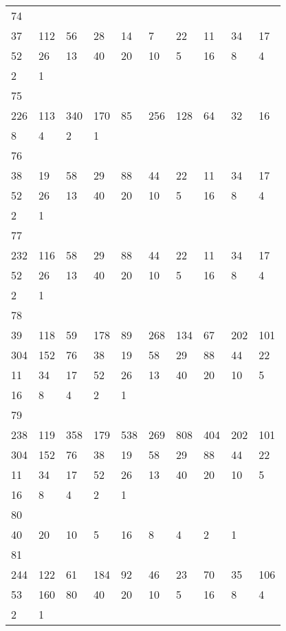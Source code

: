 \begin{longtable}{*{10}{l}}
74&&&&&&&&&\\
37& 112& 56& 28& 14& 7& 22& 11& 34& 17\\
52& 26& 13& 40& 20& 10& 5& 16& 8& 4\\
2& 1& \\

75&&&&&&&&&\\
226& 113& 340& 170& 85& 256& 128& 64& 32& 16\\
8& 4& 2& 1& \\

76&&&&&&&&&\\
38& 19& 58& 29& 88& 44& 22& 11& 34& 17\\
52& 26& 13& 40& 20& 10& 5& 16& 8& 4\\
2& 1& \\

77&&&&&&&&&\\
232& 116& 58& 29& 88& 44& 22& 11& 34& 17\\
52& 26& 13& 40& 20& 10& 5& 16& 8& 4\\
2& 1& \\

78&&&&&&&&&\\
39& 118& 59& 178& 89& 268& 134& 67& 202& 101\\
304& 152& 76& 38& 19& 58& 29& 88& 44& 22\\
11& 34& 17& 52& 26& 13& 40& 20& 10& 5\\
16& 8& 4& 2& 1& \\

79&&&&&&&&&\\
238& 119& 358& 179& 538& 269& 808& 404& 202& 101\\
304& 152& 76& 38& 19& 58& 29& 88& 44& 22\\
11& 34& 17& 52& 26& 13& 40& 20& 10& 5\\
16& 8& 4& 2& 1& \\

80&&&&&&&&&\\
40& 20& 10& 5& 16& 8& 4& 2& 1& \\

81&&&&&&&&&\\
244& 122& 61& 184& 92& 46& 23& 70& 35& 106\\
53& 160& 80& 40& 20& 10& 5& 16& 8& 4\\
2& 1& \\


\end{longtable}
